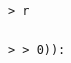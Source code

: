 \documentclass[10pt,a4paper]{article} %
\begin{document}
\begin{lstlisting}
                                                                                                                                                                                                                                                                                                                                                                                                                                                                                                                                                                                                                                                                                                                                                                                                                                                                                                                                                                                                                                                                                                                                                                                                                                            > r
                                                                                                                                                                                                                                                                                                                                                                                                                                                                                                                                                                                                                                                                                                                                                                                                                                                                                                                                                                                                                                                                                                                                                                                                                                            > > 0)):

\end{lstlisting}
\end{document}
